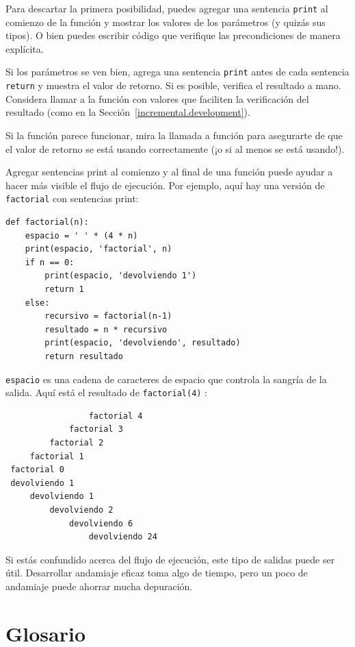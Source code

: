 \documentclass[10pt]{book}
\begin{document}
Para descartar la primera posibilidad, puedes agregar una sentencia {\tt print}
al comienzo de la función y mostrar los valores de los
parámetros (y quizás sus tipos).  O bien puedes escribir código
que verifique las precondiciones de manera explícita.

Si los parámetros se ven bien, agrega una sentencia {\tt print} antes de cada
sentencia {\tt return} y muestra el valor de retorno.  Si es
posible, verifica el resultado a mano.  Considera llamar a la
función con valores que faciliten la verificación del resultado
(como en la Sección~\ref{incremental.development}).

Si la función parece funcionar, mira la llamada a función
para asegurarte de que el valor de retorno se está usando correctamente (¡o si al
menos se está usando!).

Agregar sentencias print al comienzo y al final de una función
puede ayudar a hacer más visible el flujo de ejecución.
Por ejemplo, aquí hay una versión de {\tt factorial} con
sentencias print:

\begin{verbatim}
def factorial(n):
    espacio = ' ' * (4 * n)
    print(espacio, 'factorial', n)
    if n == 0:
        print(espacio, 'devolviendo 1')
        return 1
    else:
        recursivo = factorial(n-1)
        resultado = n * recursivo
        print(espacio, 'devolviendo', resultado)
        return resultado
\end{verbatim}
%
{\tt espacio} es una cadena de caracteres de espacio que controla la
sangría de la salida.  Aquí está el resultado de {\tt factorial(4)} :

\begin{verbatim}
                 factorial 4
             factorial 3
         factorial 2
     factorial 1
 factorial 0
 devolviendo 1
     devolviendo 1
         devolviendo 2
             devolviendo 6
                 devolviendo 24
\end{verbatim}
%
Si estás confundido acerca del flujo de ejecución, este tipo de
salidas puede ser útil.  Desarrollar andamiaje eficaz toma algo de
tiempo, pero un poco de andamiaje puede ahorrar mucha depuración.


\section{Glosario}
\end{document}
